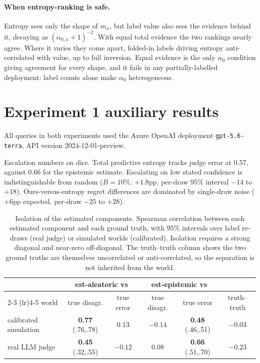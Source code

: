 \documentclass{article}
\begin{document}
\paragraph{When entropy-ranking is safe.}
Entropy sees only the shape of $m_x$, but label value also sees the evidence behind it,
decaying as $(\alpha_{0,x}+1)^{-2}$. With equal total evidence the two rankings
nearly agree. Where it varies they come apart, folded-in labels driving entropy
anti-correlated with value, up to full inversion. Equal evidence is the only
$\alpha_0$ condition giving agreement for every shape, and it fails in any
partially-labelled deployment: label counts alone make $\alpha_0$ heterogeneous.

\section{Experiment 1 auxiliary results}
\label{app:exp1}

All queries in both experiments used the Azure OpenAI deployment
\texttt{gpt-5.6-terra}, API version 2024-12-01-preview.

Escalation numbers on dice. Total predictive entropy tracks judge error at 0.57,
against 0.66 for the epistemic estimate. Escalating on low stated confidence is
indistinguishable from random ($B=10\%$: $+1.8$pp, per-draw 95\% interval $-14$
to $+18$). Ours-versus-entropy regret differences are dominated by single-draw
noise ($+6$pp expected, per-draw $-25$ to $+28$).

\begin{table}[h]
  \caption{Isolation of the estimated components. Spearman correlation between each estimated
    component and each ground truth, with 95\% intervals over label re-draws (real judge) or
    simulated worlds (calibrated). Isolation requires a strong diagonal and near-zero
    off-diagonal. The truth--truth column shows the two ground truths are themselves
    uncorrelated or anti-correlated, so the separation is not inherited from the world.}
  \label{tab:isolation}
  \centering
  \small
  \begin{tabular}{lccccc}
    \toprule
    & \multicolumn{2}{c}{est-aleatoric vs} & \multicolumn{2}{c}{est-epistemic vs} & \\
    \cmidrule(lr){2-3} \cmidrule(lr){4-5}
    world & true disagr. & true error & true disagr. & true error & truth--truth \\
    \midrule
    calibrated simulation & \textbf{0.77} (.76,.78) & 0.13 & $-0.14$
      & \textbf{0.48} (.46,.51) & $-0.03$ \\
    real LLM judge & \textbf{0.45} (.32,.55) & $-0.12$ & 0.08
      & \textbf{0.66} (.51,.70) & $-0.23$ \\
    \bottomrule
  \end{tabular}
\end{table}
\end{document}
